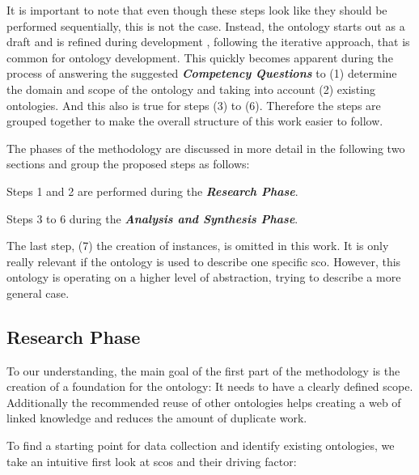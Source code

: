 \documentclass[a4paper, DIV=13, BCOR=0cm]{scrbook}
\newcommand{\pn}[1]{\textit{\textbf{#1}}}
\begin{document}
It is important to note that even though these steps look like they should be performed sequentially, this is not the case. Instead, the ontology starts out as a draft and is refined during development \cite[Section 3, Introduction]{guide-to-ontology}, following the iterative approach, that is common for ontology development. \cite[p.\,158, section 1.5.1]{stuckenschmidt2010ontologien} This quickly becomes apparent during the process of answering the suggested \pn{Competency Questions} to (1) determine the domain and scope of the ontology \cite[Section 3, Step 1]{guide-to-ontology} and taking into account (2) existing ontologies. And this also is true for steps (3) to (6). Therefore the steps are grouped together to make the overall structure of this work easier to follow.

The phases of the methodology are discussed in more detail in the following two sections and group the proposed steps as follows:

\begin{compactenum}
	\item Steps 1 and 2 are performed during the \pn{Research Phase}.
	\item Steps 3 to 6 during the \pn{Analysis and Synthesis Phase}.
\end{compactenum}

The last step, (7) the creation of instances, is omitted in this work. It is only really relevant if the ontology is used to describe one specific \gls{sco}. However, this ontology is operating on a higher level of abstraction, trying to describe a more general case.

\subsection{Research Phase}
To our understanding, the main goal of the first part of the methodology is the creation of a foundation for the ontology: It needs to have a clearly defined scope. Additionally the recommended reuse of other ontologies helps creating a web of linked knowledge and reduces the amount of duplicate work.

To find a starting point for data collection and identify existing ontologies, we take an intuitive first look at \glspl{sco} and their driving factor:
\end{document}
